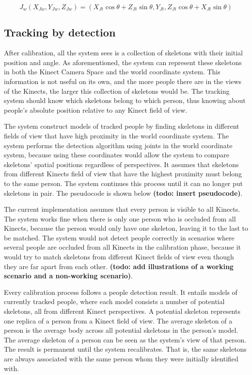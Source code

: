 \documentclass{sigchi}
\begin{document}
\begin{equation}
\label{eq:joint_worldview}
J_w (X_{Jw}, Y_{Jw}, Z_{Jw}) = (X_{Jt}\cos\theta + Z_{Jt}\sin\theta, Y_{Jt}, Z_{Jt}\cos\theta + X_{Jt}\sin\theta)
\end{equation}

\subsection{Tracking by detection}

After calibration, all the system sees is a collection of skeletons with their initial position and angle. As aforementioned, the system can represent these skeletons in both the Kinect Camera Space and the world coordinate system. This information is not useful on its own, and the more people there are in the views of the Kinects, the larger this collection of skeletons would be. The tracking system should know which skeletons belong to which person, thus knowing about people's absolute position relative to any Kinect field of view.

The system construct models of tracked people by finding skeletons in different fields of view that have high proximity in the world coordinate system. The system performs the detection algorithm using joints in the world coordinate system, because using these coordinates would allow the system to compare skeletons' spatial positions regardless of perspectives. It assumes that skeletons from different Kinects field of view that have the highest proximity must belong to the same person. The system continues this process until it can no longer put skeletons in pair. The pseudocode is shown below \textbf{(todo: insert pseudocode)}.

The current implementation assumes that every person is visible to all Kinects. The system works fine when there is only one person who is occluded from all Kinects, because the person would only have one skeleton, leaving it to the last to be matched. The system would not detect people correctly in scenarios where several people are occluded from all Kinects in the calibration phase, because it would try to match skeletons from different Kinect fields of view even though they are far apart from each other. \textbf{(todo: add illustrations of a working scenario and a non-working scenario)}.

Every calibration process follows a people detection result. It entails models of currently tracked people, where each model consists a number of potential skeletons, all from different Kinect perspectives. A potential skeleton represents one replica of a person from a Kinect field of view. The average skeleton of a person is the average body across all potential skeletons in the person's model. The average skeleton of a person can be seen as the system's view of that person. The result is permanent until the system recalibrates. That is, the same skeletons are always associated with the same person whom they were initially identified with. 
\end{document}
